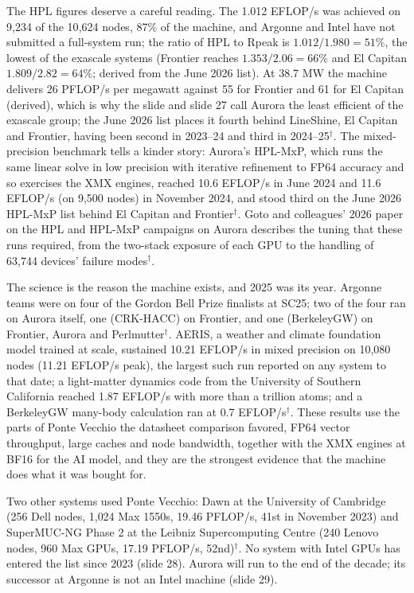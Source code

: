 \documentclass[11pt,letterpaper]{article}
\begin{document}
The HPL figures deserve a careful reading. The 1.012 EFLOP/s was achieved on 9{,}234 of the 10{,}624 nodes, 87\% of the machine, and Argonne and Intel have not submitted a full-system run; the ratio of HPL to Rpeak is $1.012 / 1.980 = 51\%$, the lowest of the exascale systems (Frontier reaches $1.353 / 2.06 = 66\%$ and El Capitan $1.809 / 2.82 = 64\%$; derived from the June 2026 list). At 38.7 MW the machine delivers 26 PFLOP/s per megawatt against 55 for Frontier and 61 for El Capitan (derived), which is why the slide and slide 27 call Aurora the least efficient of the exascale group; the June 2026 list places it fourth behind LineShine, El Capitan and Frontier, having been second in 2023--24 and third in 2024--25$^\dagger$. The mixed-precision benchmark tells a kinder story: Aurora's HPL-MxP, which runs the same linear solve in low precision with iterative refinement to FP64 accuracy and so exercises the XMX engines, reached 10.6 EFLOP/s in June 2024 and 11.6 EFLOP/s (on 9{,}500 nodes) in November 2024, and stood third on the June 2026 HPL-MxP list behind El Capitan and Frontier$^\dagger$. Goto and colleagues' 2026 paper on the HPL and HPL-MxP campaigns on Aurora describes the tuning that these runs required, from the two-stack exposure of each GPU to the handling of 63{,}744 devices' failure modes$^\dagger$.

The science is the reason the machine exists, and 2025 was its year. Argonne teams were on four of the Gordon Bell Prize finalists at SC25; two of the four ran on Aurora itself, one (CRK-HACC) on Frontier, and one (BerkeleyGW) on Frontier, Aurora and Perlmutter$^\dagger$. AERIS, a weather and climate foundation model trained at scale, sustained 10.21 EFLOP/s in mixed precision on 10{,}080 nodes (11.21 EFLOP/s peak), the largest such run reported on any system to that date; a light-matter dynamics code from the University of Southern California reached 1.87 EFLOP/s with more than a trillion atoms; and a BerkeleyGW many-body calculation ran at 0.7 EFLOP/s$^\dagger$. These results use the parts of Ponte Vecchio the datasheet comparison favored, FP64 vector throughput, large caches and node bandwidth, together with the XMX engines at BF16 for the AI model, and they are the strongest evidence that the machine does what it was bought for.

Two other systems used Ponte Vecchio: Dawn at the University of Cambridge (256 Dell nodes, 1{,}024 Max 1550s, 19.46 PFLOP/s, 41st in November 2023) and SuperMUC-NG Phase 2 at the Leibniz Supercomputing Centre (240 Lenovo nodes, 960 Max GPUs, 17.19 PFLOP/s, 52nd)$^\dagger$. No system with Intel GPUs has entered the list since 2023 (slide 28). Aurora will run to the end of the decade; its successor at Argonne is not an Intel machine (slide 29).
\end{document}
